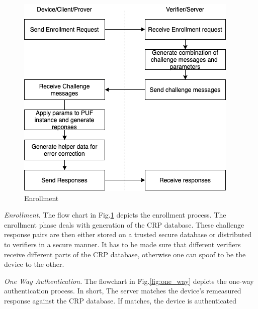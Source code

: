 \documentclass[journal, a4paper]{IEEEtran}
\begin{document}
\begin{figure}[!hbt]
    \begin{center}
    \includegraphics[scale=0.5]{figs/enrollment.png}
    \caption{Enrollment}
    \label{fig:enroll}
    \end{center}
\end{figure}

\textit{Enrollment.} The flow chart in Fig.\ref{fig:enroll} depicts the enrollment process. The enrollment phase deals with generation of the CRP database. These challenge response pairs are then either stored on a trusted secure database or distributed to verifiers in a secure manner. It has to be made sure that different verifiers receive different parts of the CRP database, otherwise one can spoof to be the device to the other.

\textit{One Way Authentication.} The flowchart in Fig.\ref{fig:one_way} depicts the one-way authentication process. In short, The server matches the device's remeasured response against the CRP database. If matches, the device is authenticated
\end{document}
